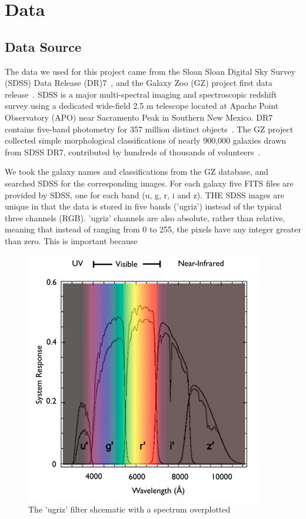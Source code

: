 \section{Data}
\label{sec:data}
\subsection{Data Source}
The data we used for this project came from the Sloan Sloan Digital Sky Survey (SDSS) Data Release (DR)7~\cite{abazajian2009seventh}, and the Galaxy Zoo (GZ) project first data release~\cite{lintott2010galaxy}. 
SDSS is a major multi-spectral imaging and spectroscopic redshift survey using a dedicated wide-field 2.5 m telescope located at Apache Point Observatory (APO) near Sacramento Peak in Southern New Mexico.
DR7 contains five-band photometry for 357 million distinct objects~\cite{abazajian2009seventh}. 
The GZ project collected simple morphological classifications of nearly 900,000 galaxies drawn from SDSS DR7, contributed by hundreds of thousands of volunteers~\cite{lintott2010galaxy}. 

We took the galaxy names and classifications from the GZ database, and searched SDSS for the corresponding images. For each galaxy five FITS files are provided by SDSS, one for each band (u, g, r, i and z). 
THE SDSS inages are unique in that the data is stored in five bands ('ugriz') instead of the typical three channels (RGB). 'ugriz' channels are also absolute, rather than relative, meaning that instead of ranging from 0 to 255, the pixels have any integer greater than zero. This is important because 


\begin{figure}[h]
	\centering
	\captionsetup{justification=centering}
	\includegraphics[scale=0.7]{Figures/filters.jpg}
	\caption{The 'ugriz' filter shcematic with a spectrum overplotted}
	\label{fig:filters}
\end{figure}



